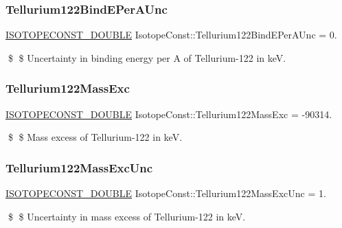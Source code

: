 \subsubsection{\texorpdfstring{Tellurium122\+Bind\+E\+Per\+A\+Unc}{Tellurium122BindEPerAUnc}}
{\footnotesize\ttfamily \mbox{\hyperlink{group___isotope_const-_macros_ga8f45a7272ce02c0b4c65c44636ed719a}{I\+S\+O\+T\+O\+P\+E\+C\+O\+N\+S\+T\+\_\+\+D\+O\+U\+B\+LE}} Isotope\+Const\+::\+Tellurium122\+Bind\+E\+Per\+A\+Unc = 0.}

\$ \$ Uncertainty in binding energy per A of Tellurium-\/122 in keV. \mbox{\label{group___isotope_const-_tellurium-_te122_ga54c60158bdf37e840daef14c87fa861a}} 
\subsubsection{\texorpdfstring{Tellurium122\+Mass\+Exc}{Tellurium122MassExc}}
{\footnotesize\ttfamily \mbox{\hyperlink{group___isotope_const-_macros_ga8f45a7272ce02c0b4c65c44636ed719a}{I\+S\+O\+T\+O\+P\+E\+C\+O\+N\+S\+T\+\_\+\+D\+O\+U\+B\+LE}} Isotope\+Const\+::\+Tellurium122\+Mass\+Exc = -\/90314.}

\$ \$ Mass excess of Tellurium-\/122 in keV. \mbox{\label{group___isotope_const-_tellurium-_te122_gab4ace1bb1b44fc16a3288869a1b06df4}} 
\subsubsection{\texorpdfstring{Tellurium122\+Mass\+Exc\+Unc}{Tellurium122MassExcUnc}}
{\footnotesize\ttfamily \mbox{\hyperlink{group___isotope_const-_macros_ga8f45a7272ce02c0b4c65c44636ed719a}{I\+S\+O\+T\+O\+P\+E\+C\+O\+N\+S\+T\+\_\+\+D\+O\+U\+B\+LE}} Isotope\+Const\+::\+Tellurium122\+Mass\+Exc\+Unc = 1.}

\$ \$ Uncertainty in mass excess of Tellurium-\/122 in keV. \mbox{\label{group___isotope_const-_tellurium-_te122_ga6f6f742a8129b7a2cc0151881bc31325}} 
